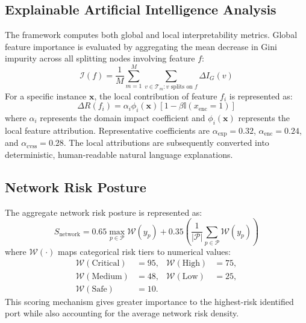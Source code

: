 \documentclass[conference]{IEEEtran}
\begin{document}
\subsection{Explainable Artificial Intelligence Analysis}
The framework computes both global and local interpretability metrics. Global feature importance is evaluated by aggregating the mean decrease in Gini impurity across all splitting nodes involving feature $f$:
\begin{equation}
\mathcal{I}(f) = \frac{1}{M} \sum_{m=1}^{M} \sum_{v \in \mathcal{T}_m : v \text{ splits on } f} \Delta I_G(v)
\end{equation}
For a specific instance $\mathbf{x}$, the local contribution of feature $f_i$ is represented as:
\begin{equation}
\Delta R(f_i) = \alpha_i \phi_i(\mathbf{x}) [1 - \beta \mathbb{I}(x_{\text{enc}} = 1)]
\end{equation}
where $\alpha_i$ represents the domain impact coefficient and $\phi_i(\mathbf{x})$ represents the local feature attribution. Representative coefficients are $\alpha_{\text{exp}} = 0.32$, $\alpha_{\text{enc}} = 0.24$, and $\alpha_{\text{cvss}} = 0.28$. The local attributions are subsequently converted into deterministic, human-readable natural language explanations.

\subsection{Network Risk Posture}
The aggregate network risk posture is represented as:
\begin{equation}
S_{\text{network}} = 0.65 \max_{p \in \mathcal{P}} \mathcal{W}(y_p) + 0.35 \left( \frac{1}{|\mathcal{P}|} \sum_{p \in \mathcal{P}} \mathcal{W}(y_p) \right)
\end{equation}
where $\mathcal{W}(\cdot)$ maps categorical risk tiers to numerical values:
\begin{equation}
\begin{aligned}
\mathcal{W}(\text{Critical}) &= 95, & \mathcal{W}(\text{High}) &= 75, \\
\mathcal{W}(\text{Medium}) &= 48, & \mathcal{W}(\text{Low}) &= 25, \\
\mathcal{W}(\text{Safe}) &= 10.
\end{aligned}
\end{equation}
This scoring mechanism gives greater importance to the highest-risk identified port while also accounting for the average network risk density.
\end{document}
